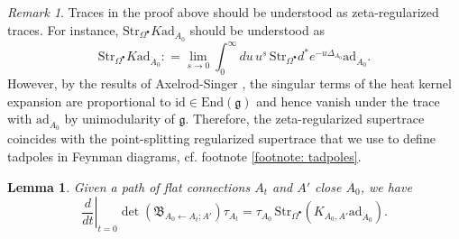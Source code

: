 \documentclass[11pt,a4paper]{amsart}
\theoremstyle{plain} %
\newtheorem{lem}[thm]{Lemma}
\theoremstyle{definition}
\theoremstyle{remark}
\newtheorem{rem}[thm]{Remark}
\newcommand{\g}{\mathfrak{g}}
\newcommand{\mr}{\mathrm}
\newcommand{\bt}{\bullet}
\newcommand{\ra}{\rightarrow}
\newcommand{\ad}{\mathrm{ad}}
\newcommand{\la}{\leftarrow}
\newcommand{\BB}{\mathfrak{B}}
\begin{document}
\begin{rem}\label{rem: regularization of supertraces}
    Traces in the proof above should be understood as zeta-regularized traces. For instance, $\mr{Str}_{\Omega^\bt}K\ad_{\dot{A}_0}$ should be understood as
    \begin{equation}
        \mr{Str}_{\Omega^\bt}K\ad_{\dot{A}_0}\colon=\lim_{s\ra 0} \int_0^\infty du\, u^s\, \mr{Str}_{\Omega^\bt} d^* e^{-u \Delta_{A_0}} \ad_{\dot{A}_0}.
    \end{equation}
    However, by the results of Axelrod-Singer \cite{Axelrod1991}, the singular terms of the heat kernel expansion are proportional to $\mr{id}\in \mr{End}(\g)$ and hence vanish under the trace with $\ad_{\dot{A}_0}$ by unimodularity of $\g$. Therefore, the zeta-regularized supertrace coincides with the point-splitting regularized supertrace that we use to define tadpoles in Feynman diagrams, cf. footnote \ref{footnote: tadpoles}.
\end{rem}

\begin{lem}\label{lemma D.2}
    Given a path of flat connections $A_t$ and $A'$ close $A_0$, we have
    \begin{equation}
    \left. \frac{d}{dt}\right|_{t=0} \det(\BB_{A_0\la A_t;A'})\tau_{A_t} = \tau_{A_0} \,\mr{Str}_{\Omega^\bt} (K_{A_0,A'} \ad_{\dot{A}_0}).
    \end{equation}
\end{lem}
\end{document}
